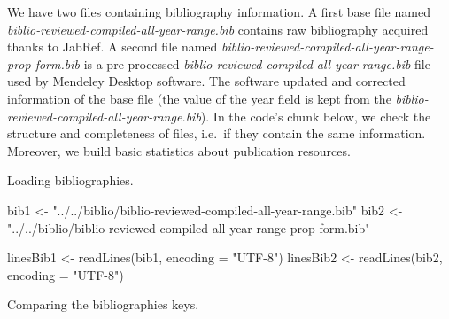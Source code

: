 \documentclass[
]{article}
\newenvironment{Shaded}{\begin{snugshade}}{\end{snugshade}}
\newcommand{\AttributeTok}[1]{\textcolor[rgb]{0.77,0.63,0.00}{#1}}
\newcommand{\FunctionTok}[1]{\textcolor[rgb]{0.00,0.00,0.00}{#1}}
\newcommand{\NormalTok}[1]{#1}
\newcommand{\OtherTok}[1]{\textcolor[rgb]{0.56,0.35,0.01}{#1}}
\newcommand{\SpecialCharTok}[1]{\textcolor[rgb]{0.00,0.00,0.00}{#1}}
\newcommand{\StringTok}[1]{\textcolor[rgb]{0.31,0.60,0.02}{#1}}
\begin{document}
We have two files containing bibliography information. A first base file named \emph{biblio-reviewed-compiled-all-year-range.bib} contains raw bibliography acquired thanks to JabRef. A second file named \emph{biblio-reviewed-compiled-all-year-range-prop-form.bib} is a pre-processed \emph{biblio-reviewed-compiled-all-year-range.bib} file used by Mendeley Desktop software. The software updated and corrected information of the base file (the value of the year field is kept from the \emph{biblio-reviewed-compiled-all-year-range.bib}). In the code's chunk below, we check the structure and completeness of files, i.e.~if they contain the same information. Moreover, we build basic statistics about publication resources.

Loading bibliographies.

\begin{Shaded}
\begin{Highlighting}[]
\NormalTok{bib1 }\OtherTok{\textless{}{-}} \StringTok{"../../biblio/biblio{-}reviewed{-}compiled{-}all{-}year{-}range.bib"}
\NormalTok{bib2 }\OtherTok{\textless{}{-}} \StringTok{"../../biblio/biblio{-}reviewed{-}compiled{-}all{-}year{-}range{-}prop{-}form.bib"}

\NormalTok{linesBib1 }\OtherTok{\textless{}{-}} \FunctionTok{readLines}\NormalTok{(bib1, }\AttributeTok{encoding =} \StringTok{"UTF{-}8"}\NormalTok{)}
\NormalTok{linesBib2 }\OtherTok{\textless{}{-}} \FunctionTok{readLines}\NormalTok{(bib2, }\AttributeTok{encoding =} \StringTok{"UTF{-}8"}\NormalTok{)}
\end{Highlighting}
\end{Shaded}

Comparing the bibliographies keys.

\begin{Shaded}
\end{Shaded}
\end{document}
